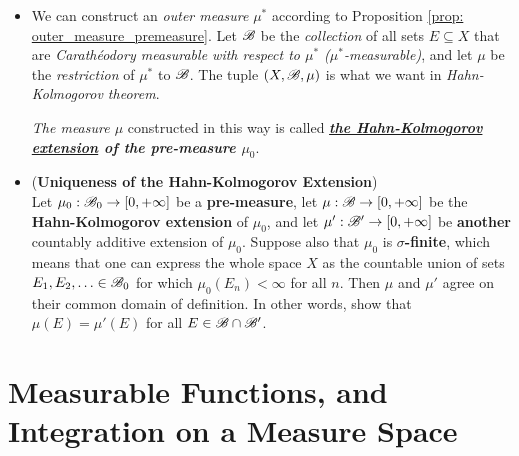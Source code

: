\documentclass[11pt]{article}
\begin{document}
\begin{itemize}
\item \begin{remark}
We can construct an \emph{outer measure} $\mu^{*}$ according to Proposition \ref{prop: outer_measure_premeasure}. Let ${\mathscr B}$ be the \emph{collection} of all sets $E \subseteq X$ that are \textit{Carath\'eodory measurable with respect to $\mu^{*}$ ($\mu^{*}$-measurable)}, and let $\mu$ be the \emph{restriction} of $\mu^{*}$  to ${\mathscr B}$. The tuple $(X, {\mathscr B}, \mu)$ is what we want in \emph{Hahn-Kolmogorov theorem}. 

\emph{The measure $\mu$} constructed in this way is called \emph{\textbf{ \underline{the Hahn-Kolmogorov extension} of the pre-measure $\mu_0$}}. 
\end{remark}

\item \begin{proposition} (\textbf{Uniqueness of the Hahn-Kolmogorov Extension})\\
Let $\mu_0 : {\mathscr B}_0 \rightarrow [0, +\infty]$ be a \textbf{pre-measure}, let $\mu : {\mathscr B} \rightarrow [0, +\infty]$ be the \textbf{Hahn-Kolmogorov extension} of $\mu_0$, and let $\mu' : {\mathscr B}' \rightarrow  [0, +\infty]$ be \textbf{another} countably additive extension of $\mu_0$. Suppose also that $\mu_0$ is \textbf{$\sigma$-finite}, which means that one can express the whole space $X$ as the countable union of sets $E_1, E_2, \ldots \in {\mathscr B}_{0}$ for which $\mu_0(E_n) < \infty$ for all $n$. Then $\mu$ and $\mu'$ agree on their common domain of definition. In other words, show that  $\mu(E) = \mu'(E)$ for all $E \in {\mathscr B} \cap {\mathscr B}'$.
\end{proposition} 
\end{itemize}
\newpage
\section{Measurable Functions, and Integration on a Measure Space}
\end{document}
